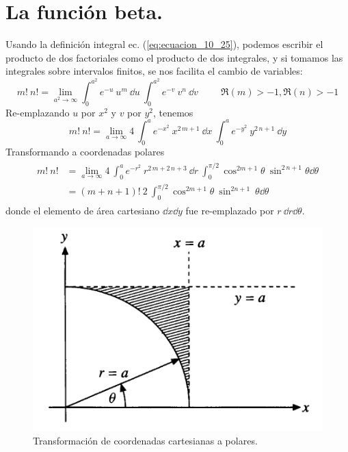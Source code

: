 \section{La función beta.}
Usando la definición integral ec. (\ref{eq:ecuacion_10_25}), podemos escribir el producto de dos factoriales como el producto de dos integrales, y si tomamos las integrales sobre intervalos finitos, se nos facilita el cambio de variables:
\begin{equation}
m! \: n! = \lim_{a^{2} \to \infty} \int_{0}^{a^{2}} e^{-u} \: u^{m} \: \dd{u} \: \int_{0}^{a^{2}} e^{-v} \: v^{n} \: \dd{v} \hspace{1cm} \Re (m) > -1, \Re (n) > -1
\label{eq:ecuacion_10_56a}
\end{equation}
Re-emplazando $u$ por $x^{2}$ y $v$ por $y^{2}$, tenemos
\begin{equation}
m! \: n! =  \lim_{a \to \infty} 4 \: \int_{0}^{a} e^{-x^{2}} \: x ^{2 \, m+1} \: \dd{x} \: \int_{0}^{a} e^{-y^{2}} \: y^{2 \, n+1} \: \dd{y}
\label{eq:ecuacion_10_56b}
\end{equation}
Transformando a coordenadas polares
\begin{align}
\begin{aligned}
m! \: n! &= \lim_{a \to \infty} 4 \: \int_{0}^{a} e^{-r^{2}} \: r^{2 \, m + 2 \, n+3} \: \dd{r} \: \int_{0}^{\pi/2} \cos^{2m+1} \theta \: \sin^{2 \, n+1} \theta \dd{\theta} \\
&= (m + n + 1)! \: 2 \: \int_{0}^{\pi/2} \cos^{2m+1} \theta \: \sin^{2n+1} \: \theta \dd{\theta}
\label{eq:ecuacion_10_58}
\end{aligned}
\end{align}
donde el elemento de área cartesiano $\dd{x} \dd{y}$ fue re-emplazado por $r \: \dd{r} \dd{\theta}$.

\begin{figure}
    \centering
    \includegraphics[scale=0.4]{Imagenes/FuncionBeta_01.png}
    \caption{Transformación de coordenadas cartesianas a polares.}
    \label{fig:figura_10_06}
\end{figure}

